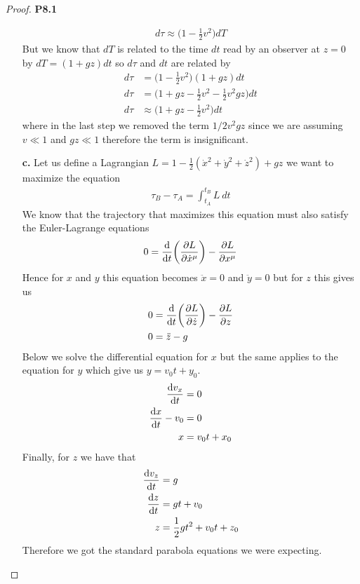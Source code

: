 \documentclass[11pt]{article}
\theoremstyle{definition}
\begin{document}
\begin{proof}{\textbf{P8.1}}
\begin{itemize}
\begin{align*}
        d\tau \approx \bigg(1 - \frac{1}{2}v^2\bigg) dT
    \end{align*}
    But we know that $dT$ is related to the time $dt$ read by an observer at
    $z=0$ by $dT = (1 + gz)dt$ so $d\tau$ and $dt$ are related by
    \begin{align*}
        d\tau &= \bigg(1 - \frac{1}{2}v^2\bigg) (1 + gz) dt\\
        d\tau &= \bigg(1 + gz -\frac{1}{2}v^2 - \frac{1}{2}v^2 gz\bigg) dt\\
        d\tau &\approx \bigg(1 + gz -\frac{1}{2}v^2\bigg) dt
    \end{align*}
    where in the last step we removed the term $1/2v^2 gz$ since we are
    assuming $v \ll 1$ and $gz \ll 1$ therefore the term is insignificant.
    \item [\textbf{c.}]
    Let us define a Lagrangian
    $L = 1 - \frac{1}{2}(\dot x^2 + \dot y^2 + \dot z^2) + gz$
    we want to maximize the equation
    \begin{align*}
        \tau_B - \tau_A = \int_{t_A}^{t_B} L~dt
    \end{align*}
    We know that the trajectory that maximizes this equation must also satisfy
    the Euler-Lagrange equations
    \begin{align*}
        0 = \derivative{}{t}\bigg(\partialderivative{L}{\dot x^\mu}\bigg)
        - \partialderivative{L}{x^\mu}
    \end{align*}
    Hence for $x$ and $y$ this equation becomes $\ddot x = 0$ and $\ddot y = 0$
    but for $z$ this gives us 
    \begin{align*}
        0 &= \derivative{}{t}\bigg(\partialderivative{L}{\dot z}\bigg)
        - \partialderivative{L}{z}\\
        0 &= \ddot z - g
    \end{align*}
    Below we solve the differential equation for $x$ but the same applies to
    the equation for $y$ which give us $y = v_0 t + y_0$.
    \begin{align*}
        \derivative{v_x}{t} &= 0\\
        \derivative{x}{t} - v_0 &= 0\\
        x &= v_0t + x_0
    \end{align*}
    Finally, for $z$ we have that
    \begin{align*}
        \derivative{v_z}{t} &= g\\
        \derivative{z}{t} &= gt + v_0\\
        z &= \frac{1}{2}gt^2 + v_0 t + z_0
    \end{align*}
    Therefore we got the standard parabola equations we were expecting.
\end{itemize}
\end{proof}
\end{document}
